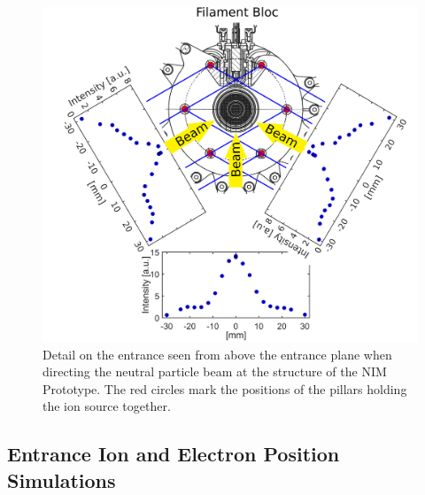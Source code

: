 	\begin{figure}[h!]
		\centering
		\includegraphics[width=\textwidth]{Experiments/Entrence_Proto_topview.png}
		\caption{Detail on the entrance seen from above the entrance plane when directing the neutral particle beam at the structure of the NIM Prototype. The red circles mark the positions of the pillars holding the ion source together.}
		\label{exp:ProtoIntCharEnt}
	\end{figure}
	
	
	\subsection{Entrance Ion and Electron Position Simulations}
	
